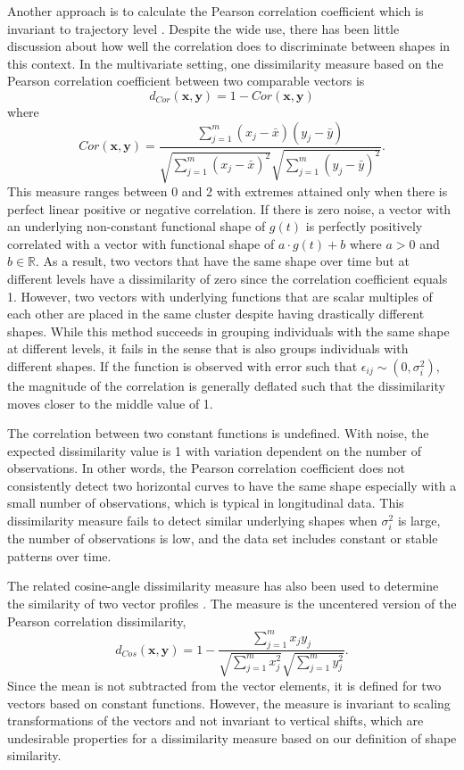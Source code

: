 \documentclass[12pt]{article}
\newcommand{\B}[0]{\mathbf}
\begin{document}
Another approach is to calculate the Pearson correlation coefficient which is invariant to trajectory level \cite{chouakria2007, eisen1998, chiou2008}. Despite the wide use, there has been little discussion about how well the correlation does to discriminate between shapes in this context. In the multivariate setting, one dissimilarity measure based on the Pearson correlation coefficient between two comparable vectors is 
$$d_{Cor}(\B x,\B y) = 1-Cor(\B x,\B y)$$ 
where $$Cor(\B x,\B y) = \frac{\sum^{m}_{j=1}(x_{j}-\bar{x})(y_{j}-\bar{y})}{\sqrt{\sum^{m}_{j=1}(x_{j}-\bar{x})^{2}}\sqrt{\sum^{m}_{j=1}(y_{j}-\bar{y})^{2}}}.$$
This measure ranges between 0 and 2 with extremes attained only when there is perfect linear positive or negative correlation. If there is zero noise, a vector with an underlying non-constant functional shape of $g(t)$ is perfectly positively correlated with a vector with functional shape of $a\cdot g(t) + b$ where $a>0$ and $b\in\mathbb{R}$. As a result, two vectors that have the same shape over time but at different levels have a dissimilarity of zero since the correlation coefficient equals 1. However, two vectors with underlying functions that are scalar multiples of each other are placed in the same cluster despite having drastically different shapes. While this method succeeds in grouping individuals with the same shape at different levels, it fails in the sense that is also groups individuals with different shapes. If the function is observed with error such that $\epsilon_{ij}\sim(0,\sigma_{i}^{2}),$ the magnitude of the correlation is generally deflated such that the dissimilarity moves closer to the middle value of 1.

The correlation between two constant functions is undefined. With noise, the expected dissimilarity value is 1 with variation dependent on the number of observations. In other words, the Pearson correlation coefficient does not consistently detect two horizontal curves to have the same shape especially with a small number of observations, which is typical in longitudinal data. This dissimilarity measure fails to detect similar underlying shapes when $\sigma_{i}^{2}$ is large, the number of observations is low, and the data set includes constant or stable patterns over time. 

The related cosine-angle dissimilarity measure has also been used to determine the similarity of two vector profiles \cite{eisen1998}. The measure is the uncentered version of the Pearson correlation dissimilarity,
$$d_{Cos}(\B x,\B y) = 1- \frac{\sum^{m}_{j=1}x_{j}y_{j}}{\sqrt{\sum^{m}_{j=1}x_{j}^{2}}\sqrt{\sum^{m}_{j=1}y_{j}^{2}}}.$$
Since the mean is not subtracted from the vector elements, it is defined for two vectors based on constant functions. However, the measure is invariant to scaling transformations of the vectors and not invariant to vertical shifts, which are undesirable properties for a dissimilarity measure based on our definition of shape similarity. 
\end{document}
